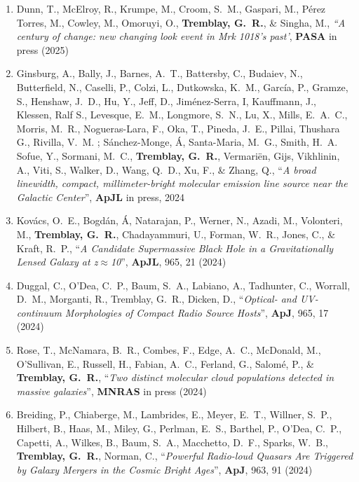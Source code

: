 \documentclass[11pt]{article}
\begin{document}
\begin{enumerate}[resume]


\item Dunn, T., McElroy, R., Krumpe, M., Croom, S.~M., Gaspari, M., P\'{e}rez Torres, M., Cowley, M., Omoruyi, O., \textbf{Tremblay, G.~R.}, \& Singha, M., \textit{``A century of change: new changing look event in Mrk 1018's past'}, \textbf{PASA} in press (2025)

\item Ginsburg, A., Bally, J., Barnes, A.~T., Battersby, C., Budaiev, N., Butterfield, N., Caselli, P., Colzi, L.,  Dutkowska, K.~M., Garc\'{i}a, P.,  Gramze, S.,  Henshaw, J.~D., Hu, Y.,  Jeff, D., Jim\'{e}nez-Serra, I, Kauffmann, J., Klessen, Ralf S., Levesque, E.~M., Longmore, S.~N., Lu, X., Mills, E.~A.~C., Morris, M.~R., Nogueras-Lara, F., Oka, T.,  Pineda, J.~E., Pillai, Thushara G.,  Rivilla, V.~M. ; S\'{a}nchez-Monge, \'{A}, Santa-Maria, M.~G., Smith, H.~A. Sofue, Y., Sormani, M.~C., \textbf{Tremblay, G.~R.}, Vermari\"{e}n, Gijs, Vikhlinin, A., Viti, S., Walker, D., Wang, Q.~D., Xu, F., \& Zhang, Q., ``\textit{A broad linewidth, compact, millimeter-bright molecular emission line source near the Galactic Center}'', \textbf{ApJL} in press, 2024

\item Kov\'{a}cs, O.~E., Bogd\'{a}n, \'{A}, Natarajan, P., Werner, N., Azadi, M., Volonteri, M., \textbf{Tremblay, G.~R.}, Chadayammuri, U., Forman, W.~R., Jones, C., \& Kraft, R.~P., ``\textit{A Candidate Supermassive Black Hole in a Gravitationally Lensed Galaxy at z$\approx$10}'', \textbf{ApJL}, 965, 21 (2024)

\item Duggal, C., O'Dea, C.~P., Baum, S.~A., Labiano, A., Tadhunter, C.,  Worrall, D.~M.,  Morganti, R., Tremblay, G.~R., Dicken, D., ``\textit{Optical- and UV-continuum Morphologies of Compact Radio Source Hosts}'', \textbf{ApJ}, 965, 17 (2024)

\item Rose, T., McNamara, B.~R., Combes, F., Edge, A.~C., McDonald, M., O'Sullivan, E.,  Russell, H.,  Fabian, A.~C., Ferland, G., Salom\'{e}, P., \& \textbf{Tremblay, G.~R.}, ``\textit{Two distinct molecular cloud populations detected in massive galaxies}'', \textbf{MNRAS} in press (2024)

\item Breiding, P., Chiaberge, M., Lambrides, E., Meyer, E.~T., Willner, S.~P., Hilbert, B., Haas, M., Miley, G., Perlman, E.~S., Barthel, P., O'Dea, C.~P., Capetti, A., Wilkes, B., Baum, S.~A., Macchetto, D.~F., Sparks, W.~B., \textbf{Tremblay, G.~R.}, Norman, C., ``\textit{Powerful Radio-loud Quasars Are Triggered by Galaxy Mergers in the Cosmic Bright Ages}'', \textbf{ApJ}, 963, 91 (2024)


\end{enumerate}
\end{document}
